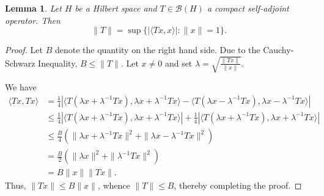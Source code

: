 \documentclass[12pt]{article}
\theoremstyle{thmstyle}
\newtheorem{lemma}[theorem]{Lemma}
\theoremstyle{defstyle}
\newcommand{\scrB}{\mathscr B}
\renewcommand{\le}{\leqslant}
\begin{document}
\begin{lemma}
    Let $H$ be a Hilbert space and $T\in\scrB(H)$ a compact self-adjoint operator. Then 
    \begin{equation*}
        \|T\| = \sup\{|\langle Tx, x\rangle|\colon \|x\| = 1\}.
    \end{equation*}
\end{lemma}
\begin{proof}
    Let $B$ denote the quantity on the right hand side. Due to the Cauchy-Schwarz Inequality, $B\le\|T\|$. Let $x\ne 0$ and set $\lambda = \sqrt{\frac{\|Tx\|}{\|x\|}}$.

    We have 
    \begin{align*}
        \langle Tx, Tx\rangle &= \frac{1}{4}\left|\langle T(\lambda x + \lambda^{-1}Tx), \lambda x + \lambda^{-1}Tx\rangle - \langle T(\lambda x - \lambda^{-1}Tx), \lambda x - \lambda^{-1}Tx\rangle\right|\\
        &\le\frac{1}{4}\left|\langle T(\lambda x + \lambda^{-1}Tx), \lambda x + \lambda^{-1}Tx\rangle\right| + \frac{1}{4}\left|\langle T(\lambda x + \lambda^{-1}Tx), \lambda x + \lambda^{-1}Tx\rangle\right|\\
        &\le\frac{B}{4}\left(\|\lambda x + \lambda^{-1}Tx\|^2 + \|\lambda x - \lambda^{-1}Tx\|^2\right)\\
        &=\frac{B}{2}\left(\|\lambda x\|^2 + \|\lambda^{-1}Tx\|^2\right)\\
        &= B\|x\|\|Tx\|.
    \end{align*}
    Thus, $\|Tx\|\le B\|x\|$, whence $\|T\|\le B$, thereby completing the proof.
\end{proof}
\end{document}
